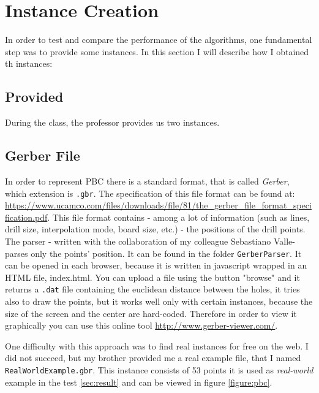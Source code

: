 \section{Instance Creation}
In order to test and compare the performance of the algorithms, one fundamental step
was to provide some instances.
In this section I will describe how I obtained th instances:
\subsection{Provided}
During the class, the professor provides us two instances.
\subsection{Gerber File}
\label{sec:Gerber}

In order to represent PBC there is a standard format, that is called \emph{Gerber}, which extension is \verb|.gbr|.
The specification of this file format can be found at: \url{https://www.ucamco.com/files/downloads/file/81/the_gerber_file_format_specification.pdf}. This file format
contains - among a lot of information (such as lines, drill size, interpolation mode, board size, etc.) -
the positions of the drill points.
The parser - written with the collaboration of my colleague Sebastiano Valle- parses only the points' position. It can be found in the folder \verb|GerberParser|. It can be opened in each browser, because it is written in javascript wrapped in an HTML file, index.html.
You can upload a file using the button "browse" and it returns a \verb|.dat| file containing the euclidean distance between the holes,
it tries also to draw the points, but it works well only with certain instances, because the size of the screen and the center are hard-coded. Therefore in order to view it graphically
you can use this online tool \url{http://www.gerber-viewer.com/}.

One difficulty with this approach was to find real instances for free on the web. I did not succeed, but my brother provided me a real example file, that I named
\verb|RealWorldExample.gbr|. 
This instance consists of 53 points it is used as \emph{real-world} example in the test \ref{sec:result} and can be viewed in figure \ref{figure:pbc}. 


